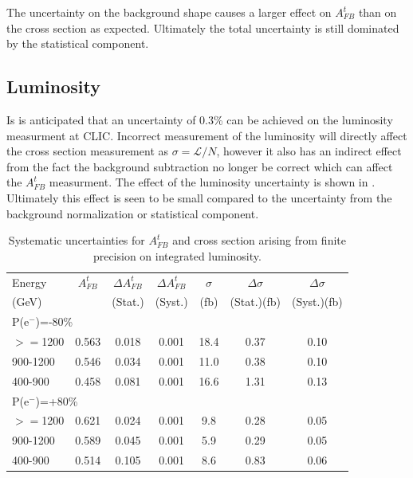 The uncertainty on the background shape causes a larger effect on $A_{FB}^t$ than on the cross section as expected. Ultimately the total uncertainty is still dominated by the statistical component. 

\subsection{Luminosity}

Is is anticipated that an uncertainty of 0.3\% can be achieved on the luminosity measurment at \ac{CLIC}. Incorrect measurement of the luminosity will directly affect the cross section measurement as $\sigma= \mathcal{L}/N$, however it also has an indirect effect from the fact the background subtraction no longer be correct which can affect the $A_{FB}^t$ measurment. The effect of the luminosity uncertainty is shown in . Ultimately this effect is seen to be small compared to the uncertainty from the background normalization or statistical component.

\begin{table}
  \centering
  \begin{tabular}{l|c|c|c|c|c|c}
    \toprule
     Energy & $A_{FB}^t$ & $\Delta A_{FB}^t$  & $\Delta A^t_{FB}$ &  $\sigma$  &  $\Delta\sigma$  &  $\Delta\sigma$ \\
     (GeV) &  & (Stat.) & (Syst.) &  (fb) &  (Stat.)(fb) &  (Syst.)(fb)\\
     \midrule
     \midrule
     \multicolumn{7}{l}{P(e$^-$)=-80\%} \\
     \midrule
     \midrule
    $>=$1200   & 0.563 & 0.018 & 0.001 & 18.4 & 0.37 & 0.10\\
    \midrule
    900-1200   & 0.546 & 0.034 & 0.001 & 11.0 & 0.38 & 0.10\\
    \midrule
    400-900    & 0.458 & 0.081 & 0.001 & 16.6 & 1.31 & 0.13\\
    \midrule
    \midrule
   \multicolumn{7}{l}{ P(e$^-$)=+80\%}\\
    \midrule
    \midrule
    $>=$1200  & 0.621 & 0.024 & 0.001 & 9.8 & 0.28 & 0.05 \\
    \midrule
    900-1200  & 0.589 & 0.045 & 0.001 & 5.9 & 0.29 & 0.05 \\
    \midrule
    400-900   & 0.514 & 0.105 & 0.001 & 8.6 & 0.83 & 0.06 \\
    \bottomrule
  \end{tabular}
  \caption{Systematic uncertainties for $A_{FB}^t$ and cross section arising from finite precision on integrated luminosity.}
  \label{tab:lumisys}
\end{table}


